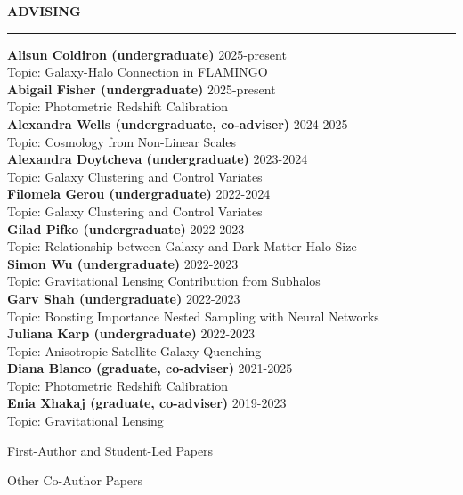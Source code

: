 \documentclass[12pt]{article}
\renewenvironment{section}[1]
  {
  \medskip
  {\color{aublue} \MakeUppercase{\bf #1}}
  \smallskip
  \hrule
  \medskip
  \begin{adjustwidth}{0.3cm}{}
  }
  {
  \end{adjustwidth}
  }
\newenvironment{ref-section}[1]
  {
  \medskip
  {\color{aublue} \MakeUppercase{\bf #1}}
  \smallskip
  \hrule
  \medskip
  \begin{refsection}
  }
  {
  \end{refsection}
  }
\newcommand{\entry}[3]{{\bf #1} \hfill {#2} \\ {#3}}
\begin{document}
\begin{section}{Advising}
  \entry{Alisun Coldiron (undergraduate)}{2025-present}{Topic: Galaxy-Halo Connection in FLAMINGO} \\
  \entry{Abigail Fisher (undergraduate)}{2025-present}{Topic: Photometric Redshift Calibration} \\
  \entry{Alexandra Wells (undergraduate, co-adviser)}{2024-2025}{Topic: Cosmology from Non-Linear Scales} \\
  \entry{Alexandra Doytcheva (undergraduate)}{2023-2024}{Topic: Galaxy Clustering and Control Variates} \\
  \entry{Filomela Gerou (undergraduate)}{2022-2024}{Topic: Galaxy Clustering and Control Variates} \\
  \entry{Gilad Pifko (undergraduate)}{2022-2023}{Topic: Relationship between Galaxy and Dark Matter Halo Size} \\
  \entry{Simon Wu (undergraduate)}{2022-2023}{Topic: Gravitational Lensing Contribution from Subhalos} \\
  \entry{Garv Shah (undergraduate)}{2022-2023}{Topic: Boosting Importance Nested Sampling with Neural Networks} \\
  \entry{Juliana Karp (undergraduate)}{2022-2023}{Topic: Anisotropic Satellite Galaxy Quenching} \\
  \entry{Diana Blanco (graduate, co-adviser)}{2021-2025}{Topic: Photometric Redshift Calibration} \\
  \entry{Enia Xhakaj (graduate, co-adviser)}{2019-2023}{Topic: Gravitational Lensing} \\
\end{section}

\begin{ref-section}{First-Author and Student-Led Papers}
  \nocite{Doytcheva2024_ApJ_977_184, Lange2024_OJAp_7_57, Lange2023_MNRAS_525_3181, Karp2023_ApJ_949_13, Lange2023_MNRAS_520_5373, Lange2022_MNRAS_509_1779, Lange2021_MNRAS_502_2074, Lange2019_MNRAS_490_1870, Lange2019_MNRAS_488_5771, Lange2019_MNRAS_487_3112, Lange2019_MNRAS_482_4824, Lange2018_MNRAS_473_2830, Lange2016_ApJ_819_4, Lange2015_MNRAS_447_939, Lange2013_AA_551_89}
  \printbibliography[heading=none]
\end{ref-section}

\begin{ref-section}{Other Co-Author Papers}
  \nocite{Rauhut2025_arXiv_2507_6098, Heydenreich2025_arXiv_2506_1677, Kwiecien2025_PhRvD_111_3524, DESICollaboration2025_arXiv_2503_4745, Blake2025_OJAp_8_24, Chen2024_PhRvD_110_3518, Mitra2024_MNRAS_533_3647, Yuan2024_MNRAS_533_589, Wang2024_ApJ_971_119, DESICollaboration2024_AJ_168_58, Xhakaj2024_MNRAS_530_4203, DESICollaboration2024_AJ_167_62, Hadzhiyska2023_MNRAS_525_4367, Ruggeri2023_MNRAS_525_3865, Wang2022_MNRAS_516_4003, DESICollaboration2022_AJ_164_207, Huang2022_MNRAS_515_4722, Xhakaj2022_MNRAS_514_2876, Dawson2022_arXiv_2203_7291, Leauthaud2022_MNRAS_510_6150, Wang2020_MNRAS_498_4450, vandenBosch2019_MNRAS_488_4984, Wang2019_MNRAS_488_3541, Zentner2019_MNRAS_485_1196, Campbell2018_MNRAS_477_359, Villarreal2017_MNRAS_472_1088, Nelson2016_ApJ_828_27, Momcheva2016_ApJS_225_27}
  \printbibliography[heading=none]
\end{ref-section}
\end{document}
